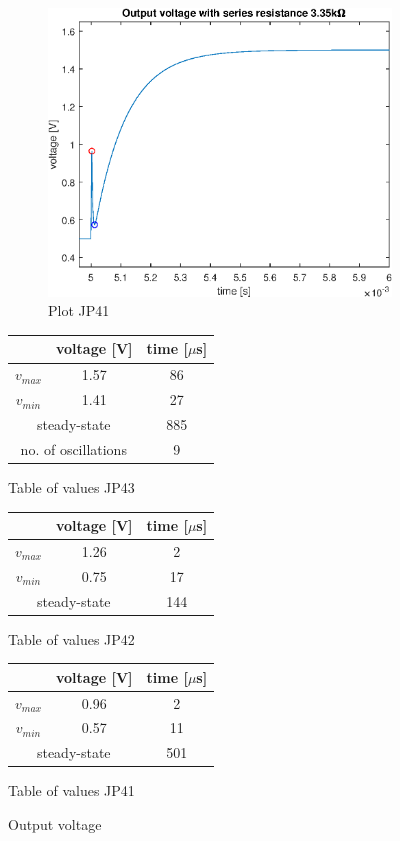 \documentclass[notitlepage, a4paper, 11pt]{article}
\begin{document}
\begin{figure}[H]
\begin{subfigure}{0.3 \textwidth}
			\includegraphics[width=\textwidth]{../Matlab/img/CircuitC1out}
			\caption{Plot JP41}
		\end{subfigure}
				\hfill
		\begin{subtable}{0.3 \textwidth}
			\centering
			\begin{tabular}{|c|c|c|}
	\hline
	& voltage [V] & time [$\mu$s] \\
	\hline
	$v_{max}$ & 1.57 & 86 \\
	\hline
	$v_{min}$ & 1.41 & 27\\
	\hline
	\multicolumn{2}{|c|}{ steady-state} & 885 \\
	\hline \hline
	\multicolumn{2}{|c|}{no. of oscillations} & 9 \\
	\hline
\end{tabular}
			\caption{Table of values JP43}
		\end{subtable}
		\hfill
		\begin{subtable}{0.3 \textwidth}
			\centering
			\begin{tabular}{|c|c|c|}
	\hline
	& voltage [V] & time [$\mu$s] \\
	\hline
	$v_{max}$ & 1.26 & 2 \\
	\hline
	$v_{min}$ & 0.75 & 17 \\
	\hline
	\multicolumn{2}{|c|}{ steady-state} & 144 \\
	\hline
\end{tabular}
			\caption{Table of values JP42}
		\end{subtable}
		\hfill
		\begin{subtable}{0.3 \textwidth}
			\centering
			\begin{tabular}{|c|c|c|}
	\hline
	& voltage [V] & time [$\mu$s] \\
	\hline
	$v_{max}$ & 0.96 & 2 \\
	\hline
	$v_{min}$ & 0.57 & 11 \\
	\hline
	\multicolumn{2}{|c|}{ steady-state} & 501 \\
	\hline
\end{tabular}
			\caption{Table of values JP41}
		\end{subtable}
		\caption{Output voltage}
	\end{figure}
	
\end{document}
